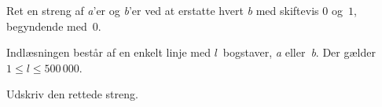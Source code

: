 
Ret en streng af \emph a'er og \emph b'er ved at erstatte hvert \emph b med skiftevis $0$ og~$1$,
begyndende med~$0$.

\begin{Input}
  Indlæsningen består af en enkelt linje med $l$~bogstaver, \emph a eller~\emph b.
  Der gælder $1\leq l\leq 500\,000$.
\end{Input}

\begin{Output}
  Udskriv den rettede streng.
\end{Output}
